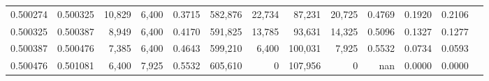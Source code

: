 \begin{tabular}{rrrrrrrrrrrrr}
0.500274 & 0.500325 &  10,829 & 6,400 &                                     0.3715 & 582,876 &  22,734 &  87,231 &  20,725 & 0.4769 & 0.1920 & 0.2106 \\
0.500325 & 0.500387 &   8,949 & 6,400 &                                     0.4170 & 591,825 &  13,785 &  93,631 &  14,325 & 0.5096 & 0.1327 & 0.1277 \\
0.500387 & 0.500476 &   7,385 & 6,400 &                                     0.4643 & 599,210 &   6,400 & 100,031 &   7,925 & 0.5532 & 0.0734 & 0.0593 \\
0.500476 & 0.501081 &   6,400 & 7,925 &                                     0.5532 & 605,610 &       0 & 107,956 &       0 &    nan & 0.0000 & 0.0000 \\
\bottomrule
\end{tabular}
